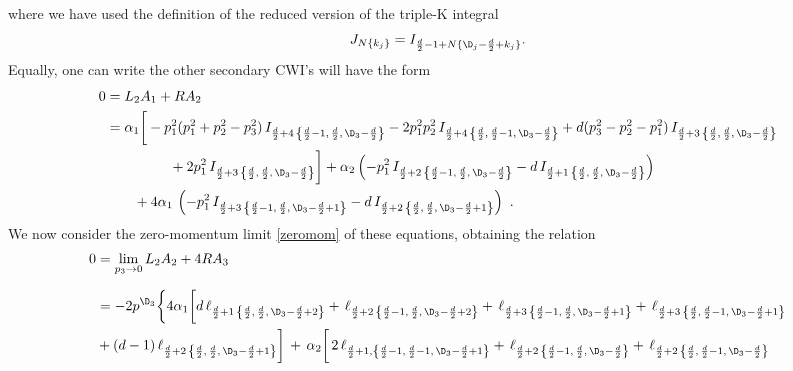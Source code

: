 \documentclass[a4paper,11pt,openright,twoside]{book}
\let\a=\alpha   \let\b=\beta   \let\g=\gamma   \let\d=\delta
\numberwithin{equation}{section}
\begin{document}
{{{where we have used the definition of the reduced version of the triple-K integral 
\begin{equation}
	J_{N\{k_j\}}=I_{\frac{d}{2}-1+N\{\D_j-\frac{d}{2}+k_j\}}.
\end{equation}
Equally, one can write the other secondary CWI's will have the form
\begin{align}
	0&=L_2A_1+RA_2\notag\\
	&=\a_1\bigg[-p_1^2(p_1^2+p_2^2-p_3^2)\,I_{\frac{d}{2}+4\,\left\{\frac{d}{2}-1,\,\frac{d}{2},\,\D_3-\frac{d}{2}\right\}}-2p_1^2p_2^2\,I_{\frac{d}{2}+4\,\left\{\frac{d}{2},\,\frac{d}{2}-1,\,\D_3-\frac{d}{2}\right\}}+d(p_3^2-p_2^2-p_1^2)\,I_{\frac{d}{2}+3\,\left\{\frac{d}{2},\,\frac{d}{2},\,\D_3-\frac{d}{2}\right\}}\notag\\
	&\hspace{1.6cm}+2p_1^2\,I_{\frac{d}{2}+3\,\left\{\frac{d}{2},\,\frac{d}{2},\,\D_3-\frac{d}{2}\right\}}\bigg] +\a_2\left(-p_1^2\,I_{\frac{d}{2}+2\,\left\{\frac{d}{2}-1,\,\frac{d}{2},\,\D_3-\frac{d}{2}\right\}}-d\,I_{\frac{d}{2}+1\,\left\{\frac{d}{2},\,\frac{d}{2},\,\D_3-\frac{d}{2}\right\}}\right)\notag\\
	&\hspace{0.7cm}+4\a_1\,\left(-p_1^2\,I_{\frac{d}{2}+3\,\left\{\frac{d}{2}-1,\,\frac{d}{2},\,\D_3-\frac{d}{2}+1\right\}}-d\,I_{\frac{d}{2}+2\,\left\{\frac{d}{2},\,\frac{d}{2},\,\D_3-\frac{d}{2}+1\right\}}\right)\ .\label{secondsecondary}
\end{align}
We now consider the zero-momentum limit \eqref{zeromom} of these equations, obtaining the relation
\begin{align}
	0&=\lim_{p_3\to0}L_2A_2+4RA_3\notag\\[1.5ex]
	&=-2p^{\D_3}\bigg\{ 4\a_1	 \bigg[d\,\ell_{\frac{d}{2}+1\,\left\{\frac{d}{2},\,\frac{d}{2},\,\D_3-\frac{d}{2}+2\right\}}+\,\ell_{\frac{d}{2}+2\,\left\{\frac{d}{2}-1,\,\frac{d}{2},\,\D_3-\frac{d}{2}+2\right\}}+\,\ell_{\frac{d}{2}+3\,\left\{\frac{d}{2}-1,\,\frac{d}{2},\,\D_3-\frac{d}{2}+1\right\}}+\,\ell_{\frac{d}{2}+3\,\left\{\frac{d}{2},\,\frac{d}{2}-1,\,\D_3-\frac{d}{2}+1\right\}}\notag\\
	&+(d-1)\,\ell_{\frac{d}{2}+2\,\left\{\frac{d}{2},\,\frac{d}{2},\,\D_3-\frac{d}{2}+1\right\}}\bigg]\,+\,\a_2\bigg[\,2\,\ell_{\frac{d}{2}+1,\left\{\frac{d}{2}-1,\,\frac{d}{2}-1,\,\D_3-\frac{d}{2}+1\right\}}+\,\ell_{\frac{d}{2}+2\,\left\{\frac{d}{2}-1,\,\frac{d}{2},\,\D_3-\frac{d}{2}\right\}}+\,\ell_{\frac{d}{2}+2\,\left\{\frac{d}{2},\,\frac{d}{2}-1,\,\D_3-\frac{d}{2}\right\}}\notag\\

\end{align}}}}
\end{document}

